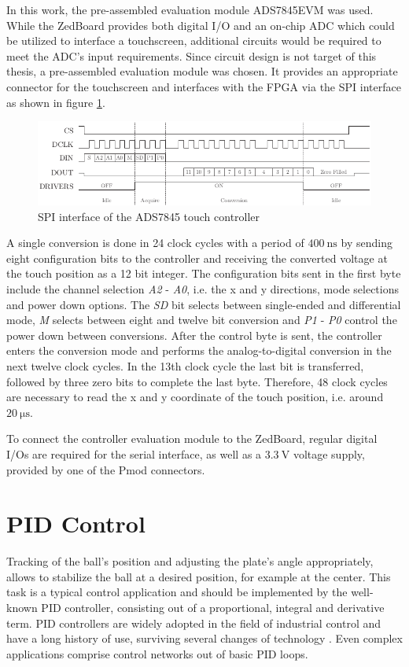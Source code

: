 In this work, the pre-assembled evaluation module ADS7845EVM \citep{ADS06} was
used. While the ZedBoard provides both digital I/O and an on-chip \ac{ADC}
which could be utilized to interface a touchscreen, additional circuits would
be required to meet the \ac{ADC}'s input requirements. Since circuit design is
not target of this thesis, a pre-assembled evaluation module was chosen. It
provides an appropriate connector for the touchscreen and interfaces with the
\ac{FPGA} via the \ac{SPI} interface as shown in figure \ref{fig:touch_spi}.
\begin{figure}
	\centering
	\includegraphics{../figures/touch_spi}
	\caption{\acs{SPI} interface of the ADS7845 touch controller \citep[adapted from][]{ADST06}}
	\label{fig:touch_spi}
\end{figure}
A single conversion is done in 24 clock cycles with a period of
$\SI{400}{\nano\second}$ by sending eight configuration bits to the controller
and receiving the converted voltage at the touch position as a 12 bit integer.
The configuration bits sent in the first byte include the channel selection
\emph{A2} - \emph{A0}, i.e. the x and y directions, mode selections and power
down options. The \emph{SD} bit selects between single-ended and differential
mode, \emph{M} selects between eight and twelve bit conversion and \emph{P1} -
\emph{P0} control the power down between conversions. After the control byte
is sent, the controller enters the conversion mode and performs the
analog-to-digital conversion in the next twelve clock cycles. In the 13th
clock cycle the last bit is transferred, followed by three zero bits to complete the last byte. Therefore, 48 clock cycles are necessary to read
the x and y coordinate of the touch position, i.e. around
$\SI{20}{\micro\second}$.

To connect the controller evaluation module to the ZedBoard, regular digital
I/Os are required for the serial interface, as well as a $\SI{3.3}{\volt}$
voltage supply, provided by one of the \ac{Pmod} connectors.

\section{\acs{PID} Control}
Tracking of the ball's position and adjusting the plate's angle appropriately,
allows to stabilize the ball at a desired position, for example at the center.
This task is a typical control application and should be implemented by the
well-known \ac{PID} controller, consisting out of a proportional, integral and
derivative term. \ac{PID} controllers are widely adopted in the field of
industrial control and have a long history of use, surviving several changes
of technology \citep{Joh05}. Even complex applications comprise control
networks out of basic \ac{PID} loops.

